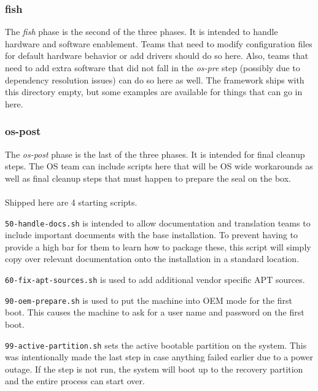 \documentclass[letterpaper,10pt,titlepage]{article}
\begin{document}
\subsubsection{fish}
The \textit{fish} phase is the second of the three phases.  It is intended to handle hardware and software enablement.  Teams that need to modify configuration files for default hardware behavior or add drivers should do so here.  Also, teams that need to add extra software that did not fall in the \textit{os-pre} step (possibly due to dependency resolution issues) can do so here as well.  The framework ships with this directory empty, but some examples are available for things that can go in here.

\subsubsection{os-post}
The \textit{os-post} phase is the last of the three phases.  It is intended for final cleanup steps.    The OS team can include scripts here that will be OS wide workarounds as well as final cleanup steps that must happen to prepare the seal on the box.
\\
\\
Shipped here are 4 starting scripts.
\begin{list}{}
\item \texttt{50-handle-docs.sh} is intended to allow documentation and translation teams to include important documents with the base installation.  To prevent having to provide a high bar for them to learn how to package these, this script will simply copy over  relevant documentation onto the installation in a standard location.
\item \texttt{60-fix-apt-sources.sh} is used to add additional vendor specific APT sources.
\item \texttt{90-oem-prepare.sh} is used to put the machine into OEM mode for the first boot.  This causes the machine to ask for a user name and password on the first boot.
\item \texttt{99-active-partition.sh} sets the active bootable partition on the system.  This was intentionally made the last step in case anything failed earlier due to a power outage.  If the step is not run, the system will boot up to the recovery partition and the entire process can start over.
\\
\end{list}
\end{document}
